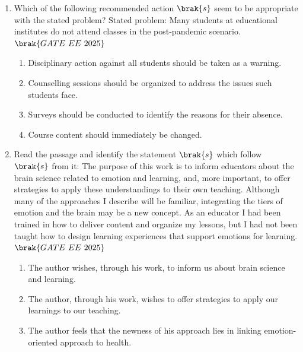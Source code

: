 \documentclass[journal,12pt,onecolumn]{IEEEtran}
\theoremstyle{remark}
\begin{document}
\begin{enumerate}
    \begin{enumerate}
      \end{enumerate}
  \item Which of the following recommended action $\brak{s}$ seem to be appropriate with the stated problem?  
      Stated problem: Many students at educational institutes do not attend classes in the post-pandemic scenario.  
     \hfill $\brak{GATE\ EE\ 2025}$
    \begin{enumerate}
  \item Disciplinary action against all students should be taken as a warning.   
  \item Counselling sessions should be organized to address the issues such students face.
  \item Surveys should be conducted to identify the reasons for their absence.
  \item Course content should immediately be changed.
   \end{enumerate}
   \item Read the passage and identify the statement $\brak{s}$ which follow $\brak{s}$ from it: 
      The purpose of this work is to inform educators about the brain science related to emotion and learning, and, more important, to offer strategies to apply these understandings to their own teaching. Although many of the approaches I describe will be familiar, integrating the tiers of emotion and the brain may be a new concept. As an educator I had been trained in how to deliver content and organize my lessons, but I had not been taught how to design learning experiences that support emotions for learning.       
     \hfill $\brak{GATE\ EE\ 2025}$
    \begin{enumerate}
    \item  The author wishes, through his work, to inform us about brain science and learning.    
  \item The author, through his work, wishes to offer strategies to apply our learnings to our teaching.    
  \item The author feels that the newness of his approach lies in linking emotion-oriented approach to health.   

\end{enumerate}
\end{enumerate}
\end{document}
